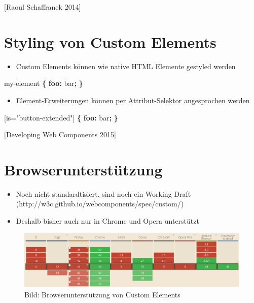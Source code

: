 \documentclass[11pt,a4paper]{report}
\newenvironment{Shaded}{}{}
\newcommand{\KeywordTok}[1]{\textcolor[rgb]{0.00,0.44,0.13}{\textbf{{#1}}}}
\newcommand{\CharTok}[1]{\textcolor[rgb]{0.25,0.44,0.63}{{#1}}}
\newcommand{\StringTok}[1]{\textcolor[rgb]{0.25,0.44,0.63}{{#1}}}
\newcommand{\NormalTok}[1]{{#1}}
\providecommand{\tightlist}{%
  \setlength{\itemsep}{0pt}\setlength{\parskip}{0pt}}
\begin{document}
{[}Raoul Schaffranek 2014{]}

\section{Styling von Custom Elements}\label{styling-von-custom-elements}

\begin{itemize}
\tightlist
\item
  Custom Elements können wie native HTML Elemente gestyled werden
\end{itemize}

\begin{Shaded}
\begin{Highlighting}[]
\NormalTok{my-element }\KeywordTok{\{}
  \KeywordTok{foo:} \NormalTok{bar}\KeywordTok{;}
\KeywordTok{\}}
\end{Highlighting}
\end{Shaded}

\begin{itemize}
\tightlist
\item
  Element-Erweiterungen können per Attribut-Selektor angesprochen werden
\end{itemize}

\begin{Shaded}
\begin{Highlighting}[]
\CharTok{[is=}\StringTok{"button-extended"}\CharTok{]} \KeywordTok{\{}
  \KeywordTok{foo:} \NormalTok{bar}\KeywordTok{;}
\KeywordTok{\}}
\end{Highlighting}
\end{Shaded}

{[}Developing Web Components 2015{]}

\section{Browserunterstützung}\label{browserunterstuxfctzung}

\begin{itemize}
\tightlist
\item
  Noch nicht standardtisiert, sind noch ein Working Draft
  (http://w3c.github.io/webcomponents/spec/custom/)
\item
  Deshalb bisher auch nur in Chrome und Opera unterstützt
\end{itemize}

\begin{figure}[htbp]
\centering
\includegraphics{images/1-custom-elements-browserunterstuetzung.jpg}
\caption{Bild: Browserunterstützung von Custom Elements}
\end{figure}
\end{document}
